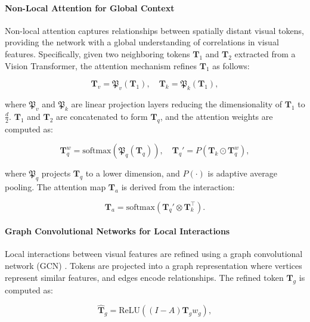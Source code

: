 \paragraph*{Non-Local Attention for Global Context}
Non-local attention \cite{wang2018non} captures relationships between spatially distant visual tokens, providing the network with a global understanding of correlations in visual features. Specifically, given two neighboring tokens $\mathbf{T}_1$ and $\mathbf{T}_2$ extracted from a Vision Transformer, the attention mechanism refines $\mathbf{T}_1$ as follows:

\begin{equation}
\mathbf{T}_v = \mathfrak{P}_v(\mathbf{T}_1), \quad \mathbf{T}_k = \mathfrak{P}_k(\mathbf{T}_1),
\end{equation}

\noindent where $\mathfrak{P}_v$ and $\mathfrak{P}_k$ are linear projection layers reducing the dimensionality of $\mathbf{T}_1$ to $\frac{d}{2}$. $\mathbf{T}_1$ and $\mathbf{T}_2$ are concatenated to form $\mathbf{T}_q$, and the attention weights are computed as:

\begin{equation}
\mathbf{T}_q^w = \text{softmax}(\mathfrak{P}_q(\mathbf{T}_q)), \quad \mathbf{T}_q' = P\left(\mathbf{T}_k \odot \mathbf{T}_q^w\right),
\end{equation}

\noindent where $\mathfrak{P}_q$ projects $\mathbf{T}_q$ to a lower dimension, and $P(\cdot)$ is adaptive average pooling. The attention map $\mathbf{T}_a$ is derived from the interaction:

\begin{equation}
\mathbf{T}_a = \text{softmax}(\mathbf{T}_q' \otimes \mathbf{T}_k^\top).
\end{equation}

\paragraph*{Graph Convolutional Networks for Local Interactions}
Local interactions between visual features are refined using a graph convolutional network (GCN) \cite{te2020edge}. Tokens are projected into a graph representation where vertices represent similar features, and edges encode relationships. The refined token $\hat{\mathbf{T}}_g$ is computed as:

\begin{equation}
\hat{\mathbf{T}}_g = \text{ReLU}\left((I - A)\mathbf{T}_g w_g\right),
\end{equation}

